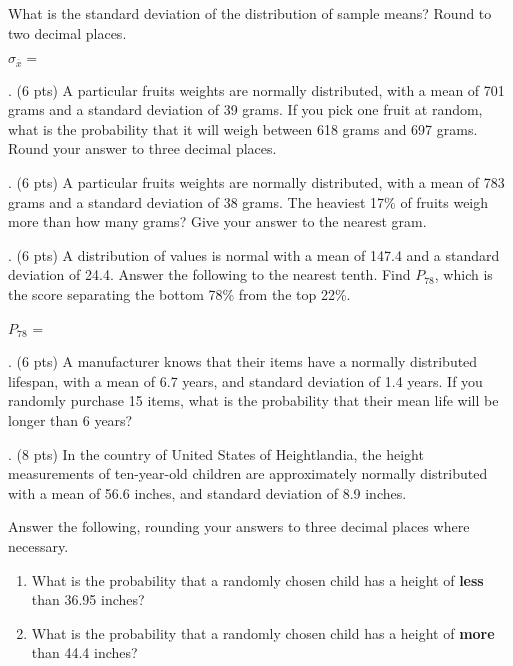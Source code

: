 \documentclass{article}
\newcommand{\newquestion}{\vspace{4mm} \noindent}
\begin{document}
\hspace{4mm}What is the standard deviation of the distribution of sample means? Round to two decimal places. \vspace{2mm}

\hspace{8mm}\(\sigma_{\overline{x}} =\)
\vspace{6mm}

\newquestion
7. (6 pts) A particular fruit\textquotesingle s weights are normally distributed, with a mean of 701 grams and a standard deviation of 39 grams. If you pick one fruit at random, what is the probability that it will weigh between 618 grams and 697 grams. Round your answer to three decimal places.
\vspace{35mm}

\newquestion
8. (6 pts) A particular fruit\textquotesingle s weights are normally distributed, with a mean of 783 grams and a standard deviation of 38 grams. The heaviest 17\% of fruits weigh more than how many grams? Give your answer to the nearest gram.
\vspace{35mm}

\newquestion
9. (6 pts) A distribution of values is normal with a mean of 147.4 and a standard deviation of 24.4. Answer the following to the nearest tenth. Find $P_{78}$, which is the score separating the bottom 78\% from the top 22\%.
\vspace{4mm}

\hspace{8mm} $P_{78}$ =
\vspace{35mm}

\pagebreak

\newquestion
10. (6 pts) A manufacturer knows that their items have a normally distributed lifespan, with a mean of 6.7 years, and standard deviation of 1.4 years. If you randomly purchase 15 items, what is the probability that their mean life will be longer than 6 years?
\vspace{40mm}

\newquestion
11. (8 pts) In the country of United States of Heightlandia, the height measurements of ten-year-old children are approximately normally distributed with a mean of 56.6 inches, and standard deviation of 8.9 inches.\\ \vspace{4mm}

Answer the following, rounding your answers to three decimal places where necessary.

\begin{enumerate}[label=\alph*.]
\item
  What is the probability that a randomly chosen child has a height of
  \textbf{less} than 36.95 inches?\\ \vspace{20mm}
\item
  What is the probability that a randomly chosen child has a height of
  \textbf{more} than 44.4 inches?\\ \vspace{20mm}
\end{enumerate}
\end{document}
